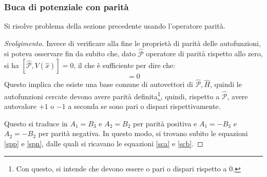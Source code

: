 \documentclass[11pt, a4paper]{scrartcl} %
\numberwithin{equation}{subsection}
\theoremstyle{style2}
\theoremstyle{style1}
\renewcommand\qedsymbol{$\blacksquare$}
\newenvironment{svolgimento}{\renewcommand\qedsymbol{$\spadesuit$}\begin{proof}[Svolgimento]}{\end{proof}}
\begin{document}
\subsubsection{Buca di potenziale con parit\`a}
Si risolve problema della sezione precedente usando l'operatore parit\`a.
\begin{svolgimento}
	Invece di verificare alla fine le propriet\`a di parit\`a delle autofunzioni, si poteva osservare fin da subito che, dato $\hat{\mathcal{P}}$ operatore di parit\`a rispetto allo zero, si ha $[\hat{\mathcal{P}},V(\hat{x})]= 0$, il che \`e sufficiente per dire che:
	\begin{equation}
		[\hat{\mathcal{P}}, \hat{H}] =0
	\end{equation}
Questo implica che esiste una base comune di autovettori di $\hat{\mathcal{P}}, \hat{H}$, 
quindi le autofunzioni cercate devono avere parit\`a definita\footnote{Con questo, si intende che devono essere o pari o dispari rispetto a $0$.}, quindi, rispetto a $\hat{\mathcal{P}}$, avere autovalore $+1$ o $-1 $ a seconda se sono pari o dispari rispettivamente.

Questo si traduce in $A_1 = B_3$ e $A_2=B_2$ per parit\`a positiva e $A_1= - B_3$ e $A_2=-B_2$ per parit\`a negativa.
In questo modo, si trovano subito le equazioni \ref{spp} e \ref{spn}, dalle quali si ricavano le equazioni \ref{sca} e \ref{scb}.
\end{svolgimento}
\end{document}

